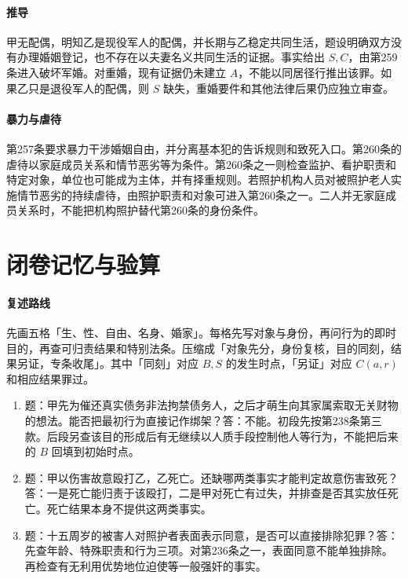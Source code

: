 \paragraph{推导}
甲无配偶，明知乙是现役军人的配偶，并长期与乙稳定共同生活，题设明确双方没有办理婚姻登记，也不存在以夫妻名义共同生活的证据。事实给出 $S,C$，由第259条进入破坏军婚。对重婚，现有证据仍未建立 $A$，不能以同居径行推出该罪。如果乙只是退役军人的配偶，则 $S$ 缺失，重婚要件和其他法律后果仍应独立审查。

\paragraph{暴力与虐待}
第257条要求暴力干涉婚姻自由，并分离基本犯的告诉规则和致死入口。第260条的虐待以家庭成员关系和情节恶劣等为条件。第260条之一则检查监护、看护职责和特定对象，单位也可能成为主体，并有择重规则。若照护机构人员对被照护老人实施情节恶劣的持续虐待，由照护职责和对象可进入第260条之一。二人并无家庭成员关系时，不能把机构照护替代第260条的身份条件。

\section*{闭卷记忆与验算}
\paragraph{复述路线}
先画五格「生、性、自由、名身、婚家」。每格先写对象与身份，再问行为的即时目的，再查可归责结果和特别法条。压缩成「对象先分，身份复核，目的同刻，结果另证，专条收尾」。其中「同刻」对应 $B,S$ 的发生时点，「另证」对应 $C(a,r)$ 和相应结果罪过。

\begin{enumerate}
\item 题：甲先为催还真实债务非法拘禁债务人，之后才萌生向其家属索取无关财物的想法。能否把最初行为直接记作绑架？答：不能。初段先按第238条第三款。后段另查该目的形成后有无继续以人质手段控制他人等行为，不能把后来的 $B$ 回填到初始时点。
\item 题：甲以伤害故意殴打乙，乙死亡。还缺哪两类事实才能判定故意伤害致死？答：一是死亡能归责于该殴打，二是甲对死亡有过失，并排查是否其实放任死亡。死亡结果本身不提供这两类事实。
\item 题：十五周岁的被害人对照护者表面表示同意，是否可以直接排除犯罪？答：先查年龄、特殊职责和行为三项。对第236条之一，表面同意不能单独排除。再检查有无利用优势地位迫使等一般强奸的事实。
\end{enumerate}
